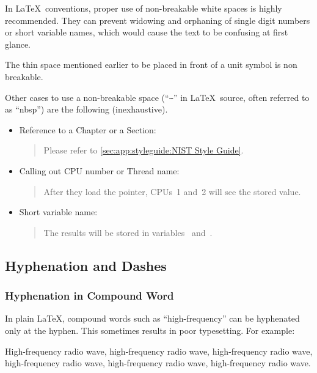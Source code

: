 In \LaTeX\ conventions, proper use of non-breakable white spaces
is highly recommended.
They can prevent widowing and orphaning of single digit numbers
or short variable names, which would cause the text to be confusing
at first glance.

The thin space mentioned earlier to be placed in front of a unit
symbol is non breakable.

Other cases to use a non-breakable space (``\verb|~|'' in \LaTeX\
source, often referred to as ``nbsp'')
are the following (inexhaustive).

\begin{itemize}
\item Reference to a Chapter or a Section:
  \begin{quote}
    Please refer to \cref{sec:app:styleguide:NIST Style Guide}.
  \end{quote}
\item Calling out CPU number or Thread name:
  \begin{quote}
    After they load the pointer, CPUs~1 and~2 will see the stored
    value.
  \end{quote}
\item Short variable name:
  \begin{quote}
    The results will be stored in variables~ and~.
  \end{quote}
\end{itemize}

\subsection{Hyphenation and Dashes}
\label{sec:app:styleguide:Hyphenation and Dashes}

\subsubsection{Hyphenation in Compound Word}
\label{sec:app:styleguide:Hyphenation in Compound Word}

In plain \LaTeX, compound words such as ``high-frequency''
can be hyphenated only at the hyphen.
This sometimes results in poor typesetting.
For example:

\begin{center}\begin{minipage}{2.6in}\vspace{0.6\baselineskip}
  High-frequency radio wave, high-frequency radio wave,
  high-frequency radio wave, high-frequency radio wave,
  high-frequency radio wave, high-frequency radio wave.
\vspace{0.6\baselineskip}\end{minipage}\end{center}

